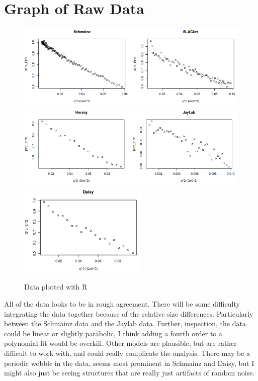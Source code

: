 \documentclass[12pt]{article}
\begin{document}
\maketitle

\section{Graph of Raw Data}

\begin{figure}[!htb]
  \centering
  \includegraphics[width=350pt]{raw_data_a.png}
  \includegraphics[width=350pt]{raw_data_b.png}
  \includegraphics[width=175pt]{raw_data_c.png}
  \caption{Data plotted with R}
\end{figure}

All of the data looks to be in rough agreement.
There will be some difficulty integrating the data together because of the relative size differences.
Particularly between the Schmainz data and the Jaylab data.
Further, inspection, the data could be linear or slightly parabolic, I think adding a fourth order to a polynomial fit would be overkill.
Other models are plausible, but are rather difficult to work with, and could really complicate the analysis.
There may be a periodic wobble in the data, seems most prominent in Schmainz and Daisy, but I might also just be seeing structures that are really just artifacts of random noise.
\end{document}
